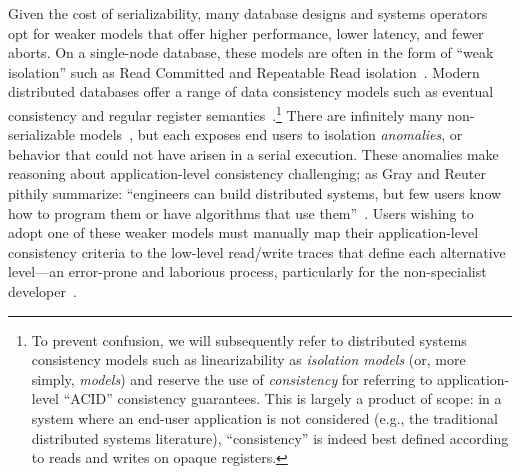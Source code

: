 
Given the cost of serializability, many database designs and systems
operators opt for weaker models that offer higher performance, lower
latency, and fewer aborts. On a single-node database, these models are
often in the form of ``weak isolation'' such as Read Committed and
Repeatable Read isolation~\cite{adya-isolation}. Modern distributed
databases offer a range of data consistency models such as eventual
consistency and regular register
semantics~\cite{hat-vldb}.\footnote{To prevent confusion, we will
  subsequently refer to distributed systems consistency models such as
  linearizability as \textit{isolation models} (or, more simply,
  \textit{models}) and reserve the use of \textit{consistency} for
  referring to application-level ``ACID'' consistency guarantees. This
  is largely a product of scope: in a system where an end-user
  application is not considered (e.g., the traditional distributed
  systems literature), ``consistency'' is indeed best defined
  according to reads and writes on opaque registers.}  There are
infinitely many non-serializable models~\cite{hat-vldb}, but each
exposes end users to isolation \textit{anomalies}, or behavior that
could not have arisen in a serial execution. These anomalies make
reasoning about application-level consistency challenging; as Gray and
Reuter pithily summarize: ``engineers can build distributed systems,
but few users know how to program them or have algorithms that use
them''~\cite{gray-book}. Users wishing to adopt one of these weaker
models must manually map their application-level consistency criteria
to the low-level read/write traces that define each alternative
level---an error-prone and laborious process, particularly for the
non-specialist developer~\cite{consistency-borders}.


